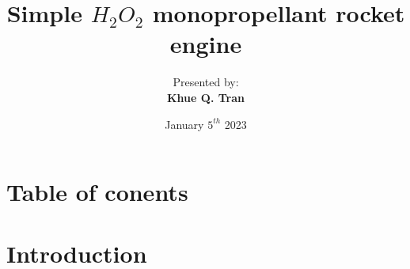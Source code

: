 \documentclass{beamer}
\title[Turbomachinary]{Simple $H_2O_2$ monopropellant rocket engine}
\author[Khue Q. Tran]{Presented by:\\
\textbf{Khue Q. Tran}\\
}
\date{January $5^{th}$ 2023}
\begin{document}
{
\begin{frame} 
    \maketitle
\end{frame}
}

\section*{Table of conents}
\begin{frame}
    \tableofcontents
\end{frame}



\section{Introduction}
\end{document}

